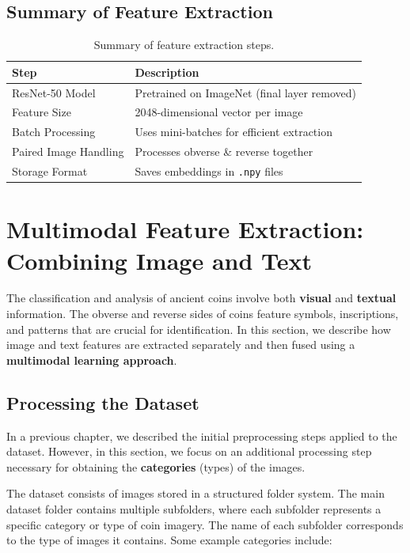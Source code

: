 \documentclass[nolibertine, english, algorithm, nomencl, minted]{ttlab-qualify}
\begin{document}
\subsection{Summary of Feature Extraction}
\begin{table}[h]
\centering
\begin{tabular}{|l|l|}
\hline
\textbf{Step}            & \textbf{Description} \\
\hline
ResNet-50 Model        & Pretrained on ImageNet (final layer removed) \\
Feature Size           & 2048-dimensional vector per image \\
Batch Processing       & Uses mini-batches for efficient extraction \\
Paired Image Handling  & Processes obverse \& reverse together \\
Storage Format         & Saves embeddings in \texttt{.npy} files \\
\hline
\end{tabular}
\caption{Summary of feature extraction steps.}
\label{tab:feature_extraction}
\end{table}


\section{Multimodal Feature Extraction: Combining Image and Text}
\label{sec:multimodal_feature_extraction}

The classification and analysis of ancient coins involve both \textbf{visual} and \textbf{textual} information. 
The obverse and reverse sides of coins feature symbols, inscriptions, and patterns that are crucial for identification. 
In this section, we describe how image and text features are extracted separately and then fused using a \textbf{multimodal learning approach}.

\subsection{Processing the Dataset}
\label{subsec:processing_dataset}
In a previous chapter, we described the initial preprocessing steps applied to the dataset. 
However, in this section, we focus on an additional processing step necessary for obtaining the \textbf{categories} (types) of the images. 

The dataset consists of images stored in a structured folder system. The main dataset folder contains multiple subfolders, 
where each subfolder represents a specific category or type of coin imagery. The name of each subfolder corresponds to the 
type of images it contains. Some example categories include:
\end{document}
